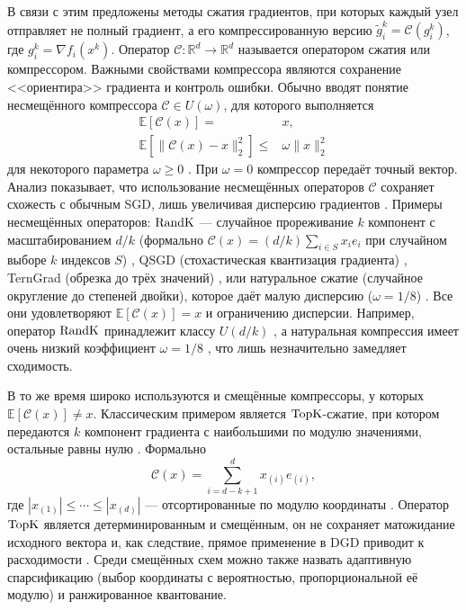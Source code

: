     В связи с этим предложены методы сжатия градиентов, при которых каждый узел отправляет не полный градиент, а его компрессированную версию $\widetilde{g}_i^k = \mathcal{C}(g_i^k)$, где $g_i^k = \nabla f_i(x^k)$. Оператор $\mathcal{C}:\mathbb{R}^d \to \mathbb{R}^d$ называется оператором сжатия или компрессором. Важными свойствами компрессора являются сохранение <<ориентира>> градиента и контроль ошибки. Обычно вводят понятие несмещённого компрессора $\mathcal{C} \in U(\omega)$, для которого выполняется
    \begin{align*}
        \mathbb{E}[\mathcal{C}(x)] =& x,\\
        \mathbb{E}[\|\mathcal{C}(x) - x\|_2^2] \leq& \omega \|x\|_2^2
    \end{align*}
    для некоторого параметра $\omega \geq 0$ \cite{horvath2022naturalcompressiondistributeddeep}. При $\omega = 0$ компрессор передаёт точный вектор. Анализ показывает, что использование несмещённых операторов $\mathcal{C}$ сохраняет схожесть с обычным SGD, лишь увеличивая дисперсию градиентов \cite{horvath2022naturalcompressiondistributeddeep,mishchenko2023distributedlearningcompressedgradient}. Примеры несмещённых операторов: $\operatorname{RandK}$ — случайное прореживание $k$ компонент с масштабированием $d/k$ (формально $\mathcal{C}(x) = (d / k) \sum_{i \in S} x_i e_i$ при случайном выборе $k$ индексов $S$) \cite{beznosikov2024biasedcompressiondistributedlearning}, QSGD (стохастическая квантизация градиента) \cite{alistarh2017qsgdcommunicationefficientsgdgradient}, TernGrad (обрезка до трёх значений) \cite{wen2017terngradternarygradientsreduce}, или натуральное сжатие (случайное округление до степеней двойки), которое даёт малую дисперсию ($\omega=1/8$) \cite{horvath2022naturalcompressiondistributeddeep}. Все они удовлетворяют $\mathbb{E}[\mathcal{C}(x)] = x$ и ограничению дисперсии. Например, оператор $\operatorname{RandK}$ принадлежит классу $U(d / k)$ \cite{beznosikov2024biasedcompressiondistributedlearning}, а натуральная компрессия имеет очень низкий коэффициент $\omega=1/8$ \cite{horvath2022naturalcompressiondistributeddeep}, что лишь незначительно замедляет сходимость.

    В то же время широко используются и смещённые компрессоры, у которых $\mathbb{E}[\mathcal{C}(x)] \neq x$. Классическим примером является $\operatorname{TopK}$-сжатие, при котором передаются $k$ компонент градиента с наибольшими по модулю значениями, остальные равны нулю \cite{beznosikov2024biasedcompressiondistributedlearning}. Формально
    \begin{equation}
        \mathcal{C}(x) = \sum_{i=d-k+1}^d x_{(i)} e_{(i)},
    \end{equation}
    где $|x_{(1)}| \leq \cdots \leq |x_{(d)}|$ — отсортированные по модулю координаты \cite{beznosikov2024biasedcompressiondistributedlearning}. Оператор $\operatorname{TopK}$ является детерминированным и смещённым, он не сохраняет матожидание исходного вектора и, как следствие, прямое применение в DGD приводит к расходимости \cite{beznosikov2024biasedcompressiondistributedlearning}. Среди смещённых схем можно также назвать адаптивную спарсификацию (выбор координаты с вероятностью, пропорциональной её модулю) \cite{beznosikov2024biasedcompressiondistributedlearning} и ранжированное квантование. 

